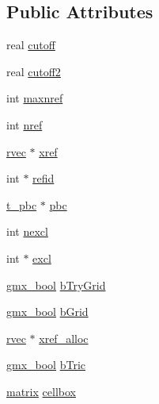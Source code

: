 \subsection*{\-Public \-Attributes}
\begin{DoxyCompactItemize}
\item 
real \hyperlink{structgmx__ana__nbsearch__t_a80a81fa98d378f0e3c274a0031ffdc95}{cutoff}
\item 
real \hyperlink{structgmx__ana__nbsearch__t_aae8e35e15305bdd6406af9698967d003}{cutoff2}
\item 
int \hyperlink{structgmx__ana__nbsearch__t_ab43fa7489900d98596a597f71bd34c15}{maxnref}
\item 
int \hyperlink{structgmx__ana__nbsearch__t_a4bf250483f5bdc6dc83a3c12f1650740}{nref}
\item 
\hyperlink{share_2template_2gromacs_2types_2simple_8h_aa02a552a4abd2f180c282a083dc3a999}{rvec} $\ast$ \hyperlink{structgmx__ana__nbsearch__t_a760b9baf9b97961c44562c925b51da92}{xref}
\item 
int $\ast$ \hyperlink{structgmx__ana__nbsearch__t_a7a64da71bd5f939defd16814226914d7}{refid}
\item 
\hyperlink{structt__pbc}{t\-\_\-pbc} $\ast$ \hyperlink{structgmx__ana__nbsearch__t_ad3dafea415ba4d8e5bdfe93cb04a38c9}{pbc}
\item 
int \hyperlink{structgmx__ana__nbsearch__t_a31344524458651286107135115ece807}{nexcl}
\item 
int $\ast$ \hyperlink{structgmx__ana__nbsearch__t_a6311e2eff1a4c1d648a4aada21c61c1c}{excl}
\item 
\hyperlink{include_2types_2simple_8h_a8fddad319f226e856400d190198d5151}{gmx\-\_\-bool} \hyperlink{structgmx__ana__nbsearch__t_ad65659eb683d42492b2115a7822a2cd6}{b\-Try\-Grid}
\item 
\hyperlink{include_2types_2simple_8h_a8fddad319f226e856400d190198d5151}{gmx\-\_\-bool} \hyperlink{structgmx__ana__nbsearch__t_aa5f4421a72fde1f9f515517c52d23825}{b\-Grid}
\item 
\hyperlink{share_2template_2gromacs_2types_2simple_8h_aa02a552a4abd2f180c282a083dc3a999}{rvec} $\ast$ \hyperlink{structgmx__ana__nbsearch__t_a497f8f2e93dc25cba45d8c526065c5b8}{xref\-\_\-alloc}
\item 
\hyperlink{include_2types_2simple_8h_a8fddad319f226e856400d190198d5151}{gmx\-\_\-bool} \hyperlink{structgmx__ana__nbsearch__t_a6b7965d058997c911314927f081ae0d2}{b\-Tric}
\item 
\hyperlink{share_2template_2gromacs_2types_2simple_8h_a7ea9c2a830d3f743b887387e33645a83}{matrix} \hyperlink{structgmx__ana__nbsearch__t_ab045c8aec28268d8b9a75ab5d645f95a}{cellbox}

\end{DoxyCompactItemize}
